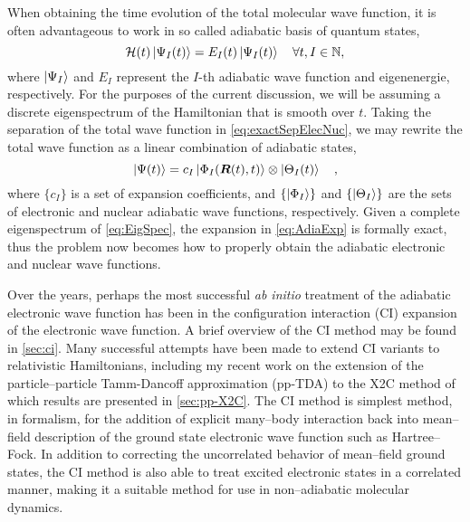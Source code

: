 When obtaining the time evolution of the total molecular wave function, it is
often advantageous to work in so called adiabatic basis of quantum states,
\begin{equation}
\mathcal{H}(t) \left\vert \Psi_I (t) \right\rangle = E_I(t) \left\vert \Psi_I (t) \right\rangle
\quad \forall t, I \in \mathbb{N},
\label{eq:EigSpec}
\end{equation}
where $\left\vert \Psi_I \right\rangle$ and $E_I$ represent the $I$-th adiabatic wave function and
eigenenergie, respectively. For the purposes of the current discussion, we will
be assuming a discrete eigenspectrum of the Hamiltonian that is smooth over $t$.
Taking the separation of the total wave function in \cref{eq:exactSepElecNuc},
we may rewrite the total wave function as a linear combination of adiabatic
states,
\begin{equation}
\left\vert \Psi (t) \right\rangle = c_I \left\vert \Phi_I (\boldsymbol{R}(t),t) \right\rangle \otimes \left\vert \Theta_I (t) \right\rangle
\quad ,
\label{eq:AdiaExp}
\end{equation}
where $\{ c_I \}$ is a set of expansion coefficients, and $\{\left\vert \Phi_I \right\rangle\}$ and
$\{\left\vert \Theta_I \right\rangle\}$ are the sets of electronic and nuclear adiabatic wave
functions, respectively. Given a complete eigenspectrum of \cref{eq:EigSpec},
the expansion in \cref{eq:AdiaExp} is formally exact, thus the problem now
becomes how to properly obtain the adiabatic electronic and nuclear wave
functions.

Over the years, perhaps the most successful \emph{ab initio} treatment of the
adiabatic electronic wave function has been in the configuration interaction
(CI) expansion of the electronic wave function. A brief overview of the CI
method may be found in \cref{sec:ci}.  Many successful attempts have been made
to extend CI variants to relativistic Hamiltonians\cite{Neese13_JCP104113,
Olsen97_TCA125, Jensen96_JCP4083}, including my recent work on the extension of
the particle--particle Tamm-Dancoff approximation (pp-TDA) to the X2C method
\cite{DBWY16_Accepted1} of which results are presented in \cref{sec:pp-X2C}. The
CI method is simplest method, in formalism, for the addition of explicit
many--body interaction back into mean--field description of the ground state
electronic wave function such as Hartree--Fock. In addition to correcting the
uncorrelated behavior of mean--field ground states, the CI method is also able
to treat excited electronic states in a correlated manner, making it a suitable
method for use in non--adiabatic molecular dynamics.

